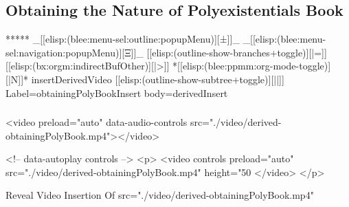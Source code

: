 \begin{whenOrg}
\section{Obtaining the Nature of Polyexistentials Book}

\begin{whenOrg}
*****  _[[elisp:(blee:menu-sel:outline:popupMenu)][±]]_ _[[elisp:(blee:menu-sel:navigation:popupMenu)][Ξ]]_ [[elisp:(outline-show-branches+toggle)][|=]] [[elisp:(bx:orgm:indirectBufOther)][|>]] *[[elisp:(blee:ppmm:org-mode-toggle)][|N]]*  insertDerivedVideo [[elisp:(outline-show-subtree+toggle)][||]] Label=obtainingPolyBookInsert  body=derivedInsert
\end{whenOrg}

\begin{frame}[fragile,plain,label=obtainingPolyBookInsert]
    \frametitle{}
    \framesubtitle{}


\begin{htmlonly} %
   \begin{presentationMode}
    \begin{rawhtml}
<video preload="auto" data-audio-controls src="./video/derived-obtainingPolyBook.mp4"></video>
    \end{rawhtml}
    \end{presentationMode}

    \begin{articleMode}
    \begin{rawhtml}
    <!-- data-autoplay  controls -->
    <p>
    <video controls  preload="auto" src="./video/derived-obtainingPolyBook.mp4" height="50%
    </video>
    </p>
     \end{rawhtml}
    \end{articleMode}
\end{htmlonly}

\begin{latexonly}

Reveal Video Insertion Of src="./video/derived-obtainingPolyBook.mp4"

\end{latexonly}


\end{frame}
\end{whenOrg}
